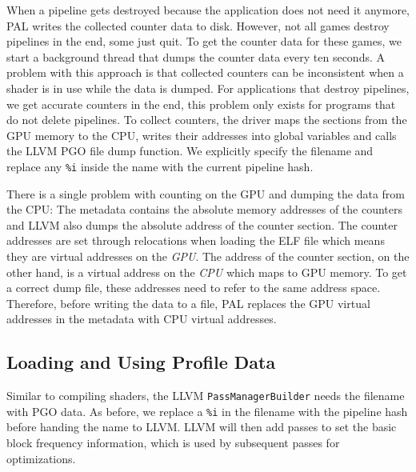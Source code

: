When a pipeline gets destroyed because the application does not need it anymore, PAL writes the collected counter data to disk.
However, not all games destroy pipelines in the end, some just quit.
To get the counter data for these games, we start a background thread that dumps the counter data every ten seconds.
A problem with this approach is that collected counters can be inconsistent when a shader is in use while the data is dumped.
For applications that destroy pipelines, we get accurate counters in the end, this problem only exists for programs that do not delete pipelines.
To collect counters, the driver maps the sections from the GPU memory to the CPU, writes their addresses into global variables and calls the LLVM PGO file dump function.
We explicitly specify the filename and replace any \texttt{\%i} inside the name with the current pipeline hash.

There is a single problem with counting on the GPU and dumping the data from the CPU:
The metadata contains the absolute memory addresses of the counters and LLVM also dumps the absolute address of the counter section.
The counter addresses are set through relocations when loading the ELF file which means they are virtual addresses on the \emph{GPU}.
The address of the counter section, on the other hand, is a virtual address on the \emph{CPU} which maps to GPU memory. To get a correct dump file, these addresses need to refer to the same address space.
Therefore, before writing the data to a file, PAL replaces the GPU virtual addresses in the metadata with CPU virtual addresses.

\subsection{Loading and Using Profile Data}
\label{sub:load}
Similar to compiling shaders, the LLVM \texttt{PassManagerBuilder} needs the filename with PGO data.
As before, we replace a \texttt{\%i} in the filename with the pipeline hash before handing the name to LLVM.
LLVM will then add passes to set the basic block frequency information, which is used by subsequent passes for optimizations.

